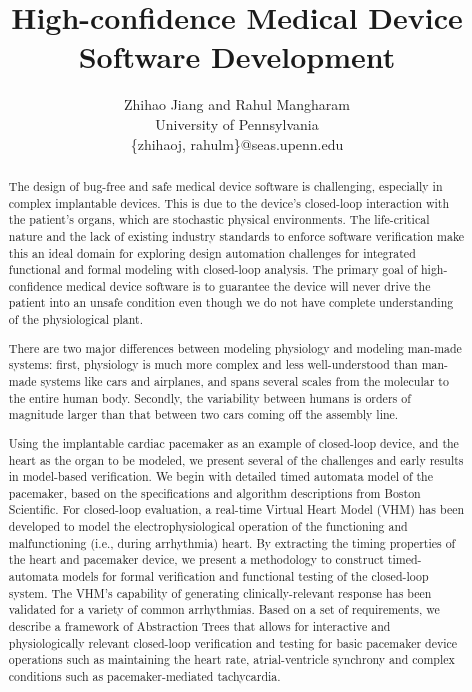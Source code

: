 \documentclass[openany]{now} %
\title{High-confidence Medical Device Software Development}
\author{
Zhihao Jiang and Rahul Mangharam \\
University of Pennsylvania\\
\{zhihaoj, rahulm\}@seas.upenn.edu
}
\begin{document}

\frontmatter  %

\maketitle

\tableofcontents

\mainmatter

\begin{abstract}
The design of bug-free and safe medical device software is challenging, especially in complex implantable devices. This is due to the device's closed-loop interaction with the patient's organs, which are stochastic physical environments. The life-critical nature and the lack of existing industry standards to enforce software verification make this an ideal domain for exploring design automation challenges for integrated functional and formal modeling with closed-loop analysis. The primary goal of high-confidence medical device software is to guarantee the device will never drive the patient into an unsafe condition even though we do not have complete understanding of the physiological plant.

There are two major differences between modeling physiology and modeling man-made systems:
first, physiology is much more complex and less well-understood than man-made systems like cars and airplanes, and spans several scales from the molecular to the entire human body.
Secondly, the variability between humans is orders of magnitude larger than that between two cars coming off the assembly line.

Using the implantable cardiac pacemaker as an example of closed-loop device, and the heart as the organ to be modeled, we present several of the challenges and early results in model-based verification. We begin with detailed timed automata model of the pacemaker, based on the specifications and algorithm descriptions from Boston Scientific. For closed-loop evaluation, a real-time Virtual Heart Model (VHM) has been developed to model the electrophysiological operation of the functioning and malfunctioning (i.e., during arrhythmia) heart. By extracting the timing properties of the heart and pacemaker device, we present a methodology to construct timed-automata models for formal verification and functional testing of the closed-loop system. The VHM's capability of generating clinically-relevant response has been validated for a variety of common arrhythmias. Based on a set of requirements, we describe a framework of Abstraction Trees that allows for interactive and physiologically relevant closed-loop verification and testing for basic pacemaker device operations such as maintaining the heart rate, atrial-ventricle synchrony and complex conditions such as pacemaker-mediated tachycardia. 


\end{abstract}
\end{document}
